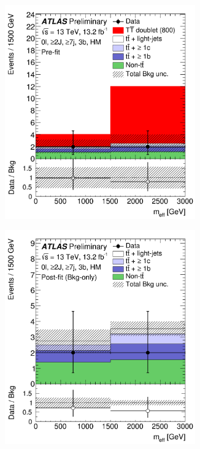 \begin{figure}[p!]
\begin{subfigure}{0.24\textwidth}
  \caption{}
  \label{}
\end{subfigure}
\begin{subfigure}{0.24\textwidth}
  \centering
  \includegraphics[width=0.9\textwidth]{figures/VLQ/fig_13a.png}
  \caption{}
  \label{}
\end{subfigure}
\begin{subfigure}{0.24\textwidth}
  \centering
  \includegraphics[width=0.9\textwidth]{figures/VLQ/fig_13b.png}

\end{subfigure}
\end{figure}
